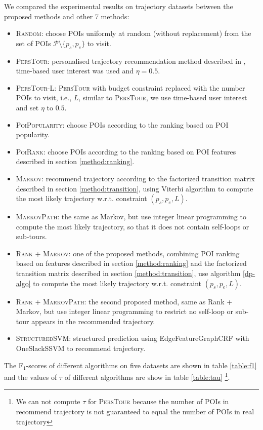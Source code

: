 We compared the experimental results on trajectory datasets between the proposed methods and other 7 methods:
\begin{itemize}
\item \textsc{Random}: choose POIs uniformly at random (without replacement) 
      from the set of POIs $\mathcal{P} \setminus \{p_s, p_e \}$ to visit.
\item \textsc{PersTour}\cite{ijcai15}: personalised trajectory recommendation method described in \cite{ijcai15}, 
      time-based user interest was used and $\eta = 0.5$.
\item \textsc{PersTour-L}: \textsc{PersTour}\cite{ijcai15} with budget constraint replaced with the number POIs to visit, i.e., $L$,
      similar to \textsc{PersTour}, we use time-based user interest and set $\eta$ to $0.5$.
\item \textsc{PoiPopularity}: choose POIs according to the ranking based on POI popularity.
\item \textsc{PoiRank}: choose POIs according to the ranking based on POI features described in section \ref{method:ranking}.
\item \textsc{Markov}: recommend trajectory according to the factorized transition matrix described in section \ref{method:transition},
      using Viterbi algorithm to compute the most likely trajectory w.r.t. constraint $(p_s, p_e, L)$.
\item \textsc{MarkovPath}: the same as Markov, but use integer linear programming to compute the most likely trajectory,
      so that it does not contain self-loops or sub-tours.
\item \textsc{Rank} + \textsc{Markov}: one of the proposed methods, combining POI ranking based on features 
      described in section \ref{method:ranking} and the factorized transition matrix described in section \ref{method:transition},
      use algorithm \ref{dp-algo} to compute the most likely trajectory w.r.t. constraint $(p_s, p_e, L)$.
\item \textsc{Rank} + \textsc{MarkovPath}: the second proposed method, same as Rank + Markov,
      but use integer linear programming to restrict no self-loop or sub-tour appears in the recommended trajectory.
\item \textsc{StructuredSVM}: structured prediction using EdgeFeatureGraphCRF with OneSlackSSVM to recommend trajectory.
\end{itemize}

The F$_1$-scores of different algorithms on five datasets are shown in table \ref{table:f1}
and the values of $\tau$ of different algorithms are show in table \ref{table:tau}
\footnote{We can not compute $\tau$ for \textsc{PersTour} because the number of POIs in recommend trajectory is not guaranteed to equal the number of POIs in real trajectory}.

